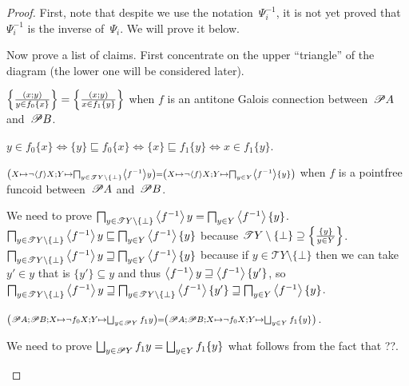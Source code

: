 \begin{proof}
First, note that despite we use the notation~$\Psi_i^{-1}$, it is not yet proved that~$\Psi_i^{-1}$ is the inverse of~$\Psi_i$. We will prove it below.

Now prove a list of claims. First concentrate on the upper ``triangle'' of the diagram (the lower one will be considered later).

\begin{claim}
$\left\{ \frac{(x;y)}{y\in f_0\{x\}}\right\}=\left\{ \frac{(x;y)}{x\in f_1\{y\}}\right\}$ when $f$ is an antitone Galois connection between~$\mathscr{P} A$ and~$\mathscr{P} B$.
\end{claim}
\begin{claimproof}
$y\in f_0\{x\}\Leftrightarrow\{y\}\sqsubseteq f_0\{x\}\Leftrightarrow\{x\}\sqsubseteq f_1\{y\}\Leftrightarrow x\in f_1\{y\}$.
\end{claimproof}

\begin{claim}
$\scriptstyle \left(X\mapsto\lnot\left\langle f\right\rangle X;Y\mapsto\bigsqcap_{y\in\mathscr{T} Y\setminus\{\bot\}}\left\langle f^{-1}\right\rangle y\right)=
\left(X\mapsto\lnot\left\langle f\right\rangle X;Y\mapsto\bigsqcap_{y\in Y}\left\langle f^{-1}\right\rangle\{y\}\right)$
when $f$ is a pointfree funcoid between~$\mathscr{P} A$ and~$\mathscr{P} B$.
\end{claim}
\begin{claimproof}
We need to prove $\bigsqcap_{y\in\mathscr{T} Y\setminus\{\bot\}}\left\langle f^{-1}\right\rangle y = \bigsqcap_{y\in Y}\left\langle f^{-1}\right\rangle\{y\}$.
$\bigsqcap_{y\in\mathscr{T} Y\setminus\{\bot\}}\left\langle f^{-1}\right\rangle y \sqsubseteq \bigsqcap_{y\in Y}\left\langle f^{-1}\right\rangle\{y\}$ because
$\mathscr{T} Y\setminus\{\bot\}\supseteq\left\{ \frac{\{y\}}{y\in Y}\right\}$.
$\bigsqcap_{y\in\mathscr{T} Y\setminus\{\bot\}}\left\langle f^{-1}\right\rangle y \sqsupseteq \bigsqcap_{y\in Y}\left\langle f^{-1}\right\rangle\{y\}$ because
if $y\in\mathscr{T} Y\setminus\{\bot\}$ then we can take $y'\in y$ that is $\{y'\}\subseteq y$ and thus
$\left\langle f^{-1}\right\rangle y \sqsupseteq \left\langle f^{-1}\right\rangle\{y'\}$, so
$\bigsqcap_{y\in\mathscr{T} Y\setminus\{\bot\}}\left\langle f^{-1}\right\rangle y \sqsupseteq \bigsqcap_{y\in\mathscr{T} Y\setminus\{\bot\}}\left\langle f^{-1}\right\rangle\{y'\} \sqsupseteq
\bigsqcap_{y\in Y}\left\langle f^{-1}\right\rangle\{y\}$.
\end{claimproof}

\begin{claim}
$\scriptstyle \left(\subsets A;\subsets B;X\mapsto\lnot f_0 X;Y\mapsto\bigsqcup_{y\in\subsets Y}f_1 y\right) =
\left(\subsets A;\subsets B;X\mapsto\lnot f_0 X;Y\mapsto\bigsqcup_{y\in Y}f_1\{y\}\right)$.
\end{claim}
\begin{claimproof}
We need to prove $\bigsqcup_{y\in\subsets Y}f_1 y = \bigsqcup_{y\in Y}f_1\{y\}$ what follows
from the fact that ??.
\end{claimproof}


\end{proof}
